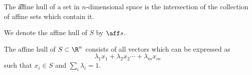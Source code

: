 
\sbasic





















\sstart
{}



The \t{affine hull} of a set in $n$-dimensional space is the intersection of the collection of affine sets which contain it.


We denote the affine hull of $S$ by $\aff s$.

\begin{prop}
  The affine hull of $S \subset \R^n$ consists of all vectors which can be expressed as
  $$
    \lambda_1 x_1 + \lambda_2 x_2 \cdots + \lambda_m x_m
  $$
  such that $x_i \in S$ and $\sum_i \lambda_i = 1$.
\end{prop}
\strats

